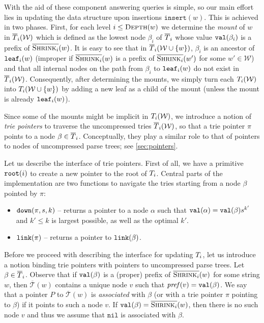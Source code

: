 \documentclass[a4paper]{article}
\theoremstyle{remark}
\newcommand{\depth}{\textsc{Depth}}
\newcommand{\cshrink}[1]{\ensuremath{\overline{\textsc{Shrink}_{#1}}}}
\newcommand{\ustree}{\mathcal{\overline{T}}}
\newcommand{\coll}{\mathcal{W}}
\newcommand{\itnil}{\mathtt{nil}}
\newcommand{\insertop}{\mathtt{insert}}
\begin{document}
With the aid of these component answering queries is simple, so our main effort lies in updating the data structure upon insertions $\insertop(w)$.
This is achieved in two phases. First, for each level $i\le \depth(w)$ we determine the \emph{mount} of $w$ in $\utrie_i(\coll)$
which is defined as the lowest node $\beta_i$ of $\overline{T}_i$ whose value $\mathtt{val}(\beta_i)$
is a prefix of $\cshrink{i}(w)$. It is easy to see that in $\utrie_{i}(\coll\cup\{w\})$, $\beta_i$ is an ancestor of $\mathtt{leaf}_i(w)$  (improper if $\cshrink{i}(w)$ is a prefix of $\cshrink{i}(w')$ for some $w'\in \coll$)
and that all internal nodes on the path from $\beta_i$ to $\mathtt{leaf}_i(w)$ do not exist in $\utrie_i(\coll)$.
Consequently, after determining the mounts, we simply turn each $\trie_i(\coll)$ into $\trie_i(\coll\cup\{w\})$
by adding a new leaf as a child of the mount (unless the mount is already $\mathtt{leaf}_i(w)$).


Since some of the mounts might be implicit in $\trie_i(\coll)$, we introduce a notion of \emph{trie pointers} to traverse the uncompressed tries
$\utrie_i(\coll)$, so that a trie pointer $\pi$ points to a node $\beta \in \overline{T}_i$.  Conceptually, they play a similar role to that of pointers to nodes of uncompressed parse trees; see \cref{sec:pointers}.

Let us describe the interface of trie pointers.
First of all, we have a primitive $\mathtt{root}(i)$ to create a new pointer to the root of $T_i$.
Central parts of the implementation are two functions to navigate the tries starting from a node $\beta$ pointed by $\pi$:
\begin{itemize}
  \item $\mathtt{down}(\pi,  s, k)$ -- returns a pointer to a node $\alpha$ such that $\mathtt{val}(\alpha)=\mathtt{val}(\beta)s^{k'}$
  and $k'\le k$ is largest possible, as well as the optimal $k'$.
  \item $\mathtt{link}(\pi)$ -- returns a pointer to $\mathtt{link}(\beta)$.
\end{itemize}

Before we proceed with describing the interface for updating $T_i$, let us introduce a notion binding trie pointers with pointers to uncompressed parse trees. Let $\beta \in \overline{T}_i$.
Observe that if $\mathtt{val}(\beta)$ is a (proper) prefix of $\cshrink{i}(w)$ for some string $w$,
then $\ustree(w)$ contains a unique node $v$ such that $\mathit{pref}(v)=\mathtt{val}(\beta)$.
We say that a pointer $P$ to $\ustree(w)$ is \emph{associated} with $\beta$ (or with a trie pointer $\pi$ pointing to $\beta$) if it points to such a node $v$.  If $\tval(\beta)=\cshrink{i}(w)$, then
there is no such node $v$ and thus we assume that $\itnil$ is associated with $\beta$.
\end{document}
